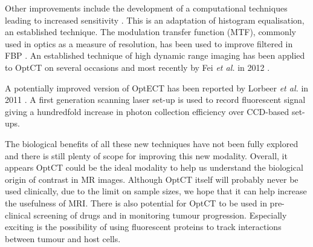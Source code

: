 Other improvements include the development of a computational techniques leading to increased sensitivity \cite{Hornblad:2011fh}. This is an adaptation of histogram equalisation, an established technique.
The modulation transfer function (MTF), commonly used in optics as a measure of resolution, has been used to improve filtered in FBP \cite{Chen:2012}.
An established technique of high dynamic range imaging has been applied to OptCT on several occasions and most recently by Fei \textit{et al.} in 2012 \cite{Peng:2012wi}.

A potentially improved version of OptECT has been reported by Lorbeer \textit{et al.} in 2011  \cite{Lorbeer:2011}. A first generation scanning laser set-up is used to record fluorescent signal giving a hundredfold increase in photon collection efficiency over CCD-based set-ups. 

The  biological benefits of all these new techniques have not been fully explored and there is still plenty of scope for improving this new modality.  Overall, it appears OptCT could be the ideal modality to help us understand the biological origin of contrast in MR images. Although OptCT itself will probably never be used clinically, due to the limit on sample sizes, we hope that it can help increase the usefulness of MRI. There is also potential for OptCT to be used in pre-clinical screening of drugs and in monitoring tumour progression. Especially exciting is the possibility of using fluorescent proteins to track interactions between tumour and host cells. 


